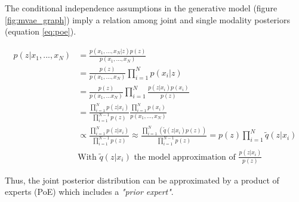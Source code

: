 \documentclass[12pt]{report}
\begin{document}
The conditional independence assumptions in the generative model (figure \ref{fig:mvae_graph}) imply a relation among joint and single modality posteriors (equation \ref{eq:poe}).

\begin{equation}
    \begin{split}
        p(z|x_1, ..., x_N) & = \frac{p(x_1, ..., x_N | z) p(z)}{p(x_1, ..., x_N)} \\
        & = \frac{p(z)}{p(x_1, ..., x_N)} \prod_{i=1}^{N} p(x_i | z) \\
        & = \frac{p(z)}{p(x_1, ... x_N)} \prod_{i=1}^{N} \frac{p(z|x_i)p(x_i)}{p(z)} \\
        & = \frac{\prod_{i=1}^{N} p(z|x_i)}{\prod_{i=1}^{N-1} p(z)} \frac{\prod_{i=1}^{N}p(x_i)}{p(x_1, ..., x_N)} \\
        & \propto \frac{\prod_{i=1}^{N} p(z|x_i)}{\prod_{i=1}^{N-1} p(z)}
        \approx \frac{\prod_{i=1}^{N} (\widetilde{q}(z|x_i)p(z))}{\prod_{i=1}^{N-1} p(z)}
        = p(z) \prod_{i=1}^{N} \widetilde{q}(z | x_i) \\
        & \text{With $\widetilde{q}(z|x_i)$ the model approximation of $\frac{p(z|x_i)}{p(z)}$}
    \label{eq:poe}
    \end{split}
\end{equation}

Thus, the joint posterior distribution can be approximated by a product of experts (PoE) which includes a \textit{"prior expert"}.
\end{document}

